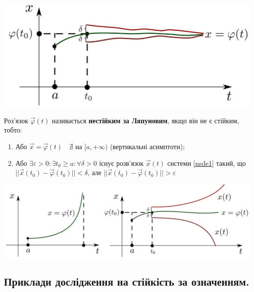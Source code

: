 \documentclass[14pt,a4paper]{scrartcl}
\theoremstyle{definition}
\theoremstyle{definition}
\theoremstyle{definition}
\begin{document}
\begin{center} \includegraphics[scale=0.35]{assets/lect2.jpg} \end{center}

Роз'язок $\overrightarrow{\varphi}(t)$ називається \textbf{нестійким за Ляпуновим}, якщо він не є стійким, тобто:
\ed

\begin{enumerate}
  \item Або $\overrightarrow{x} = \overrightarrow{\varphi}(t) \quad \nexists$ на  $[a, +\infty)$ (вертикальні асимптоти);
  \item Або $\exists \varepsilon > 0 : \exists t_0 \geq a :  \forall \delta > 0$ існує розв'язок $\overrightarrow{x}(t)$ системи \eqref{nsde1} такий, що $||\overrightarrow{x}(t_0) - \overrightarrow{\varphi}(t_0)|| < \delta$, але $||\overrightarrow{x}(t_0) - \overrightarrow{\varphi}(t_0)|| > \varepsilon$
\end{enumerate}

\vfill
\begin{center} \includegraphics[scale=1.15]{assets/lect3+4.jpg} \end{center}
\vfill
\subsection{Приклади дослідження на стійкість за означенням.}
\end{document}
